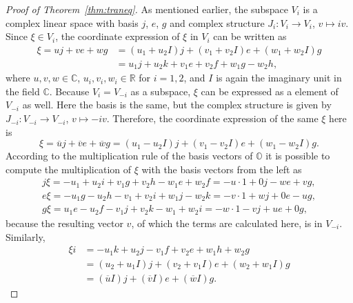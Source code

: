 \documentclass[pdftex]{sigma}
\numberwithin{equation}{section}
\newcommand{\SR}{\mathbb{R}} %
\newcommand{\SC}{\mathbb{C}} %
\newcommand{\SO}{\mathbb{O}} %
\begin{document}
\begin{proof}[Proof of Theorem~\ref{thm:traneq}]
 As mentioned earlier, the subspace $V_i$ is a complex linear space with basis $j$, $e$, $g$ and complex structure $J_i\colon V_i \rightarrow V_i$, $v \mapsto iv$. Since $\xi \in V_i$, the coordinate expression of $\xi$ in $V_i$ can be written as
 \begin{align*} \xi = uj+ve+wg&=(u_1+u_2 I)j+(v_1+v_2 I)e+(w_1+w_2 I)g\\
 & = u_1j+u_2k+v_1e+v_2f+w_1g-w_2h,
 \end{align*}
 where $u,v,w \in \SC$, $u_i,v_i,w_i \in \SR$ for $i=1,2$, and $I$ is again the imaginary unit in the field $\SC$.
 Because $V_i=V_{-i}$ as a subspace, $\xi$ can be expressed as a element of $V_{-i}$ as well. Here the basis is the same, but the complex structure is given by $J_{-i}\colon V_{-i} \rightarrow V_{-i}$, $v \mapsto -iv$. Therefore, the coordinate expression of the same $\xi$ here is
 \[ \xi =\overline{u}j+\overline{v}e+\overline{w}g=(u_1-u_2 I)j+(v_1-v_2 I)e+(w_1-w_2 I)g .\]
 According to the multiplication rule of the basis vectors of $\SO$ it is possible to compute the multiplication of $\xi$ with the basis vectors from the left as
 \begin{gather*}
 j\xi = -u_1+u_2i+v_1g+v_2h-w_1e+w_2f=-u\cdot 1+0j-we+vg,\\
 e\xi =-u_1g-u_2h-v_1+v_2i+w_1j-w_2k=-v\cdot 1+wj+0e-ug,\\
 g\xi =u_1e-u_2f-v_1j+v_2k-w_1+w_2i=-w\cdot 1-vj+ue+0g,
 \end{gather*}
 because the resulting vector $v$, of which the terms are calculated here, is in $V_{-i}$. Similarly,
 \begin{align*}
 \xi i &= -u_1k+u_2j-v_1f+v_2e+w_1h+w_2g\\
 &=(u_2+ u_1 I)j+(v_2+v_1 I)e+(w_2+w_1 I)g\\
 &=(\overline{u} I)j+(\overline{v} I)e+(\overline{w}I)g .
 \end{align*}


\end{proof}
\end{document}
